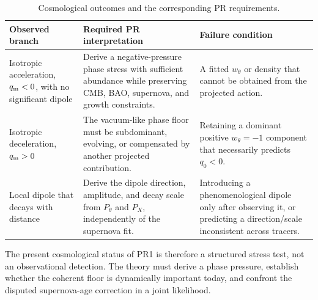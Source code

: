 \documentclass[11pt]{article}
\begin{document}
\begin{table}[H]
\centering
\caption{Cosmological outcomes and the corresponding PR requirements.}
\label{tab:pr_cosmology_outcomes}
\small
\begin{tabular}{p{5.4cm} p{5.4cm} p{5.4cm}}
\hline
\textbf{Observed branch} & \textbf{Required PR interpretation} & \textbf{Failure condition} \\
\hline
Isotropic acceleration, \(q_{\rm m}<0\), with no significant dipole
& Derive a negative-pressure phase stress with sufficient abundance while preserving CMB, BAO, supernova, and growth constraints.
& A fitted \(w_\theta\) or density that cannot be obtained from the projected action. \\
\hline
Isotropic deceleration, \(q_{\rm m}>0\)
& The vacuum-like phase floor must be subdominant, evolving, or compensated by another projected contribution.
& Retaining a dominant positive \(w_\theta=-1\) component that necessarily predicts \(q_0<0\). \\
\hline
Local dipole that decays with distance
& Derive the dipole direction, amplitude, and decay scale from \(P_\theta\) and \(P_X\), independently of the supernova fit.
& Introducing a phenomenological dipole only after observing it, or predicting a direction/scale inconsistent across tracers. \\
\hline
\end{tabular}
\end{table}

The present cosmological status of PR1 is therefore a structured stress test, not an observational detection. The theory must derive a phase pressure, establish whether the coherent floor is dynamically important today, and confront the disputed supernova-age correction in a joint likelihood.
\end{document}

